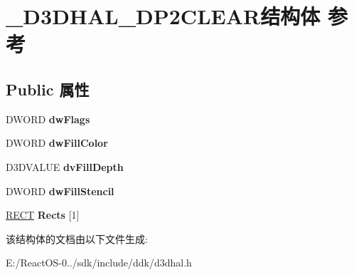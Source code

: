 \hypertarget{struct___d3_d_h_a_l___d_p2_c_l_e_a_r}{}\section{\+\_\+\+D3\+D\+H\+A\+L\+\_\+\+D\+P2\+C\+L\+E\+A\+R结构体 参考}
\label{struct___d3_d_h_a_l___d_p2_c_l_e_a_r}
\subsection*{Public 属性}
\begin{DoxyCompactItemize}
\item 
\mbox{\label{struct___d3_d_h_a_l___d_p2_c_l_e_a_r_aadd71f778f994d04b2a8a378d686ca48}} 
D\+W\+O\+RD {\bfseries dw\+Flags}
\item 
\mbox{\label{struct___d3_d_h_a_l___d_p2_c_l_e_a_r_aaa91beed657eb2fc37adef8a67bb05c1}} 
D\+W\+O\+RD {\bfseries dw\+Fill\+Color}
\item 
\mbox{\label{struct___d3_d_h_a_l___d_p2_c_l_e_a_r_a6e850018f3155ccf0d2513ff5cb54e45}} 
D3\+D\+V\+A\+L\+UE {\bfseries dv\+Fill\+Depth}
\item 
\mbox{\label{struct___d3_d_h_a_l___d_p2_c_l_e_a_r_adb89ffdbb4302ab611531c9374510721}} 
D\+W\+O\+RD {\bfseries dw\+Fill\+Stencil}
\item 
\mbox{\label{struct___d3_d_h_a_l___d_p2_c_l_e_a_r_abb26fda195d18bf1cdb999c0a007a5ef}} 
\hyperlink{structtag_r_e_c_t}{R\+E\+CT} {\bfseries Rects} \mbox{[}1\mbox{]}
\end{DoxyCompactItemize}


该结构体的文档由以下文件生成\+:\begin{DoxyCompactItemize}
\item 
E\+:/\+React\+O\+S-\/0../sdk/include/ddk/d3dhal.\+h\end{DoxyCompactItemize}
